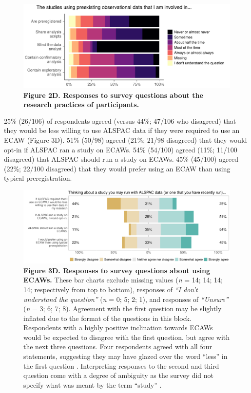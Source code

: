\documentclass[
  man,floatsintext]{apa6}
\begin{document}
\begin{figure}

{\centering \includegraphics[width=1\linewidth]{figs/methodPlotAll-1} 

}

\caption{\textbf{Figure 2D. Responses to survey questions about the research practices of participants.}}\label{fig:methodPlotAll}
\end{figure}



25\% (26/106) of respondents agreed (versus 44\%; 47/106 who disagreed) that they would be less willing to use ALSPAC data if they were required to use an ECAW (Figure 3D). 51\% (50/98) agreed (21\%; 21/98 disagreed) that they would opt-in if ALSPAC ran a study on ECAWs. 54\% (54/100) agreed (11\%; 11/100 disagreed) that ALSPAC should run a study on ECAWs. 45\% (45/100) agreed (22\%; 22/100 disagreed) that they would prefer using an ECAW than using typical preregistration.

\begin{figure}

{\centering \includegraphics[width=1\linewidth]{figs/alspacPlotAll-1} 

}

\caption{\textbf{Figure 3D. Responses to survey questions about using ECAWs.} These bar charts exclude missing values (\emph{n} = 14; 14; 14; 14; respectively from top to bottom), responses of \emph{``I don't understand the question''} (\emph{n} = 0; 5; 2; 1), and responses of \emph{``Unsure''} (\emph{n} = 3; 6; 7; 8). Agreement with the first question may be slightly inflated due to the format of the questions in this block. Respondents with a highly positive inclination towards ECAWs would be expected to disagree with the first question, but agree with the next three questions. Four respondents agreed with all four statements, suggesting they may have glazed over the word ``less'' in the first question \protect\footnotemark[2]. Interpreting responses to the second and third question come with a degree of ambiguity as the survey did not specify what was meant by the term ``study'' \protect\footnotemark[3].}\label{fig:alspacPlotAll}
\end{figure}
\end{document}
